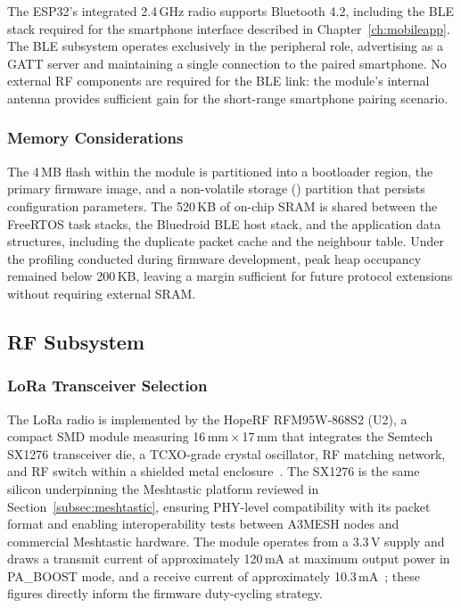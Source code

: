 \documentclass[english,bachelor]{tfgitic}[2026/01/22]
\begin{document}
The ESP32's integrated 2.4\,GHz radio supports Bluetooth 4.2, including the BLE
stack required for the smartphone interface described in Chapter~\ref{ch:mobileapp}.
The BLE subsystem operates exclusively in the peripheral role, advertising as a GATT
server and maintaining a single connection to the paired smartphone. No external RF components are
required for the BLE link: the module's internal antenna provides sufficient gain for
the short-range smartphone pairing scenario.

\subsubsection{Memory Considerations}
\label{subsec:hw_memory}

The 4\,MB flash within the module is partitioned into a bootloader region, the
primary firmware image, and a non-volatile storage () partition that persists
configuration parameters. The 520\,KB of on-chip SRAM is shared
between the FreeRTOS task stacks, the Bluedroid BLE host stack, and the application
data structures, including the duplicate packet cache and the neighbour table. Under the profiling conducted during
firmware development, peak heap occupancy remained below 200\,KB, leaving a margin
sufficient for future protocol extensions without requiring external SRAM.


\subsection{RF Subsystem}
\label{sec:hw_rf}


\subsubsection{LoRa Transceiver Selection}
\label{subsec:hw_lora}

The LoRa radio is implemented by the HopeRF RFM95W-868S2 (U2), a compact SMD module
measuring 16\,mm\,$\times$\,17\,mm that integrates the Semtech SX1276 transceiver
die, a TCXO-grade crystal oscillator, RF matching network, and RF switch within a
shielded metal enclosure~\cite{hoperf2018rfm95w, semtech2019sx1276}. The SX1276 is
the same silicon underpinning the Meshtastic platform reviewed in
Section~\ref{subsec:meshtastic}, ensuring PHY-level compatibility with its packet
format and enabling interoperability tests between A3MESH nodes and commercial
Meshtastic hardware. The module operates from a 3.3\,V supply and draws a transmit
current of approximately 120\,mA at maximum output power in PA\_BOOST mode, and a
receive current of approximately 10.3\,mA~\cite{semtech2019sx1276}; these figures
directly inform the firmware duty-cycling strategy.
\end{document}
